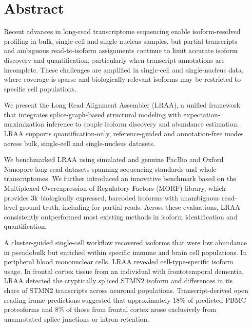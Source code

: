 \section*{Abstract}
Recent advances in long-read transcriptome sequencing enable isoform-resolved profiling in bulk, single-cell and single-nucleus samples, but partial transcripts and ambiguous read-to-isoform assignments continue to limit accurate isoform discovery and quantification, particularly when transcript annotations are incomplete. These challenges are amplified in single-cell and single-nucleus data, where coverage is sparse and biologically relevant isoforms may be restricted to specific cell populations.

We present the Long Read Alignment Assembler (LRAA), a unified framework that integrates splice-graph-based structural modeling with expectation-maximization inference to couple isoform discovery and abundance estimation. LRAA supports quantification-only, reference-guided and annotation-free modes across bulk, single-cell and single-nucleus datasets.

We benchmarked LRAA using simulated and genuine PacBio and Oxford Nanopore long-read datasets spanning sequencing standards and whole transcriptomes. We further introduced an innovative benchmark based on the Multiplexed Overexpression of Regulatory Factors (MORF) library, which provides 3k biologically expressed, barcoded isoforms with unambiguous read-level ground truth, including for partial reads. Across these evaluations, LRAA consistently outperformed most existing methods in isoform identification and quantification.

A cluster-guided single-cell workflow recovered isoforms that were low abundance in pseudobulk but enriched within specific immune and brain cell populations. In peripheral blood mononuclear cells, LRAA revealed cell-type-specific isoform usage. In frontal cortex tissue from an individual with frontotemporal dementia, LRAA detected the cryptically spliced STMN2 isoform and differences in its share of STMN2 transcripts across neuronal populations. Transcript-derived open reading frame predictions suggested that approximately 18\% of predicted PBMC proteoforms and 8\% of those from frontal cortex arose exclusively from unannotated splice junctions or intron retention.

